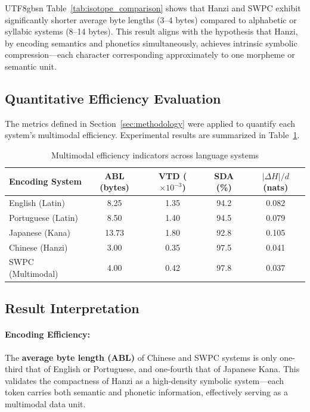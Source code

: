 \documentclass[conference]{IEEEtran}
\begin{document}
\begin{CJK*}{UTF8}{gbsn}
Table~\ref{tab:isotope_comparison} shows that Hanzi and SWPC exhibit significantly shorter average byte lengths (3–4 bytes) compared to alphabetic or syllabic systems (8–14 bytes).  
This result aligns with the hypothesis that Hanzi, by encoding semantics and phonetics simultaneously, achieves intrinsic symbolic compression—each character corresponding approximately to one morpheme or semantic unit.

\subsection{Quantitative Efficiency Evaluation}

The metrics defined in Section~\ref{sec:methodology} were applied to quantify each system’s multimodal efficiency.  
Experimental results are summarized in Table~\ref{tab:efficiency_metrics}.

\begin{table}[htbp]
\centering
\caption{Multimodal efficiency indicators across language systems}
\label{tab:efficiency_metrics}
\footnotesize
\renewcommand{\arraystretch}{1.2}
\begin{tabular}{lcccc}
\toprule
\textbf{Encoding System} & \textbf{ABL (bytes)} & \textbf{VTD ($\times10^{-3}$)} & \textbf{SDA (\%)} & \textbf{$|\Delta H|/d$ (nats)} \\
\midrule
English (Latin) & 8.25 & 1.35 & 94.2 & 0.082 \\
Portuguese (Latin) & 8.50 & 1.40 & 94.5 & 0.079 \\
Japanese (Kana) & 13.73 & 1.80 & 92.8 & 0.105 \\
Chinese (Hanzi) & 3.00 & 0.35 & 97.5 & 0.041 \\
SWPC (Multimodal) & 4.00 & 0.42 & 97.8 & 0.037 \\
\bottomrule
\end{tabular}
\end{table}

\subsection{Result Interpretation}

\paragraph{Encoding Efficiency:}  
The \textbf{average byte length (ABL)} of Chinese and SWPC systems is only one-third that of English or Portuguese, and one-fourth that of Japanese Kana.  
This validates the compactness of Hanzi as a high-density symbolic system—each token carries both semantic and phonetic information, effectively serving as a multimodal data unit.


\end{CJK*}
\end{document}
